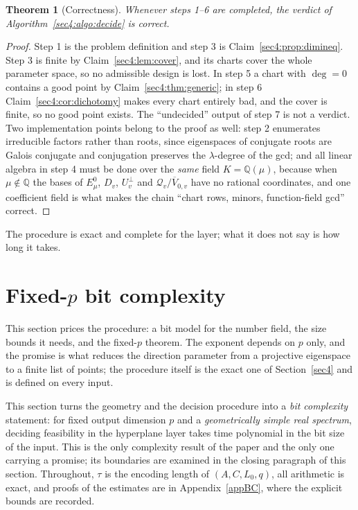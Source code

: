 \documentclass[journal]{IEEEtran}
\theoremstyle{plainn}
\newtheorem{thm}{Theorem}
\theoremstyle{remark}
\begin{document}
\begin{thm}[Correctness]
\label{sec4:prop:correct}
Whenever steps 1--6 are completed, the verdict of Algorithm~\ref{sec4:algo:decide} is correct.
\end{thm}

\begin{proof}
Step 1 is the problem definition and step 3 is Claim~\ref{sec4:prop:dimineq}. Step 3 is finite by
Claim~\ref{sec4:lem:cover}, and its charts cover the whole parameter space, so no admissible design is
lost. In step 5 a chart with $\deg=0$ contains a good point by Claim~\ref{sec4:thm:generic}; in step 6
Claim~\ref{sec4:cor:dichotomy} makes every chart entirely bad, and the cover is finite, so no good
point exists. The ``undecided'' output of step 7 is not a verdict. Two implementation points belong to
the proof as well: step 2 enumerates irreducible factors rather than roots, since eigenspaces of
conjugate roots are Galois conjugate and conjugation preserves the $\lambda$-degree of the gcd; and
all linear algebra in step 4 must be done over the \emph{same} field $K=\mathbb Q(\mu)$, because when
$\mu\notin\mathbb Q$ the bases of $E_\mu^0$, $D_v$, $U_v^\perp$ and
$\mathcal Q_v/\overline V_{0,v}$ have no rational coordinates, and one coefficient field is what makes
the chain ``chart rows, minors, function-field gcd'' correct.
\end{proof}


The procedure is exact and complete for the layer; what it does not say is how long it takes.

\section{Fixed-\texorpdfstring{$p$}{p} bit complexity}\label{sec5}\label{sec:complexity}


This section prices the procedure: a bit model for the number field, the size bounds it needs, and the
fixed-$p$ theorem. The exponent depends on $p$ only, and the promise is what reduces the direction
parameter from a projective eigenspace to a finite list of points; the procedure itself is the exact one
of Section~\ref{sec4} and is defined on every input.

This section turns the geometry and the decision procedure into a \emph{bit complexity} statement: for
fixed output dimension $p$ and a \emph{geometrically simple real spectrum}, deciding feasibility in the
hyperplane layer takes time polynomial in the bit size of the input. This is the only complexity result
of the paper and the only one carrying a promise; its boundaries are examined in the closing paragraph of this
section. Throughout, $\tau$ is the encoding length of $(A,C,L_0,q)$, all
arithmetic is exact, and proofs of the estimates are in Appendix~\ref{appBC}, where the explicit
bounds are recorded.
\end{document}
